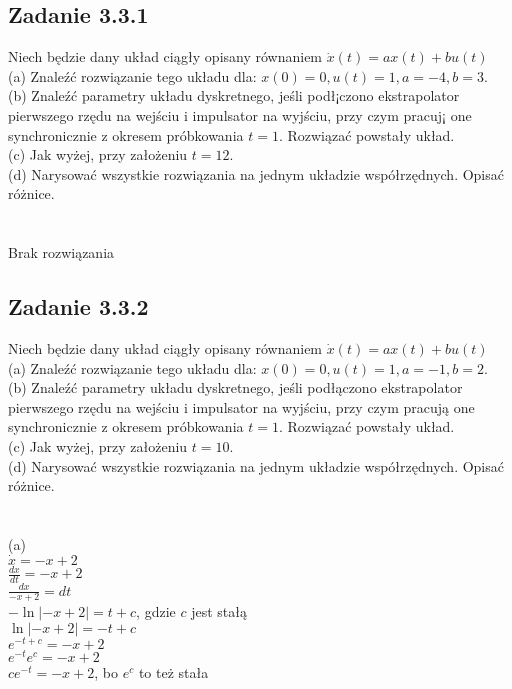 \pagebreak
\subsection*{Zadanie 3.3.1} {\color{darkgray}
	Niech będzie dany układ ciągły opisany równaniem $\dot{x}(t)=ax(t)+bu(t)$\\
	(a) Znaleźć rozwiązanie tego układu dla: $x(0)=0, u(t)=1, a=-4, b=3$.\\
	(b) Znaleźć parametry układu dyskretnego, jeśli podł¡czono ekstrapolator pierwszego rzędu na wejściu
	i impulsator na wyjściu, przy czym pracuj¡ one synchronicznie z okresem próbkowania $t = 1$. 
	Rozwiązać powstały układ.\\
	(c) Jak wyżej, przy założeniu $t = 12$.\\
	(d) Narysować wszystkie rozwiązania na jednym układzie współrzędnych. Opisać różnice.\\
}\\\\
Brak rozwiązania


\pagebreak
\subsection*{Zadanie 3.3.2} {\color{darkgray}
	Niech będzie dany układ ciągły opisany równaniem $\dot{x}(t)=ax(t)+bu(t)$\\
	(a) Znaleźć rozwiązanie tego układu dla: $x(0)=0, u(t)=1, a=-1, b=2$.\\
	(b) Znaleźć parametry układu dyskretnego, jeśli podłączono ekstrapolator pierwszego rzędu na wejściu
	i impulsator na wyjściu, przy czym pracują one synchronicznie z okresem próbkowania $t = 1$. 
	Rozwiązać powstały układ.\\
	(c) Jak wyżej, przy założeniu $t = 10$.\\
	(d) Narysować wszystkie rozwiązania na jednym układzie współrzędnych. Opisać różnice.\\
}\\\\
(a)\\
$\dot{x}=-x+2$\\
$\frac{dx}{dt}=-x+2$\\
$\frac{dx}{-x+2}=dt$\\
$-\ln |-x+2|=t+c$, gdzie $c$ jest stałą \\
$\ln |-x+2|=-t+c$\\
$e^{-t+c}=-x+2$\\
$e^{-t}e^c=-x+2$\\
$ce^{-t}=-x+2$, bo $e^c$ to też stała\\

